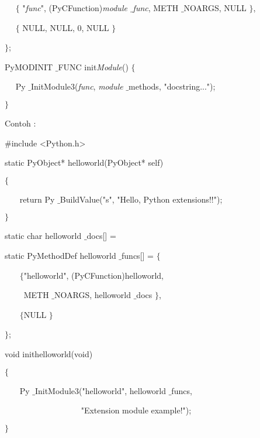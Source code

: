 \noindent 
~~  $  \{  $ "\textit{func}", (PyCFunction)\textit{module $  \_  $func}, METH $  \_  $NOARGS, NULL  $  \}  $, \par
\noindent 
~~  $  \{  $ NULL, NULL, 0, NULL  $  \}  $ \par
\noindent 
 $  \}  $; \par
\vspace{12pt}
\noindent 
PyMODINIT $  \_  $FUNC init\textit{Module}()  $  \{  $ \par
\noindent 
~~ Py $  \_  $InitModule3(\textit{func}, \textit{module} $  \_  $methods, "docstring..."); \par
\noindent 
 $  \}  $ \par
\vspace{12pt}
\vspace{12pt}
\noindent 
Contoh : \par
\noindent 
 $  \#  $include <Python.h> \par
\vspace{12pt}
\noindent 
static PyObject* helloworld(PyObject* self) \par
\noindent 
 $  \{  $ \par
\noindent 
~~~ return Py $  \_  $BuildValue("s", "Hello, Python extensions!!"); \par
\noindent 
 $  \}  $ \par
\vspace{12pt}
\noindent 
static char helloworld $  \_  $docs[] = \par
static PyMethodDef helloworld $  \_  $funcs[] =  $  \{  $ \par
\noindent 
~~~  $  \{  $"helloworld", (PyCFunction)helloworld,  \par
\noindent 
~~~~ METH $  \_  $NOARGS, helloworld $  \_  $docs $  \}  $, \par
\noindent 
~~~  $  \{  $NULL $  \}  $ \par
\noindent 
 $  \}  $; \par
\vspace{12pt}
\noindent 
void inithelloworld(void) \par
\noindent 
 $  \{  $ \par
\noindent 
~~~ Py $  \_  $InitModule3("helloworld", helloworld $  \_  $funcs, \par
\noindent 
~~~~~~~~~~~~~~~~~~ "Extension module example!"); \par
\noindent 
 $  \}  $ \par
\vspace{12pt}
\vspace{12pt}
